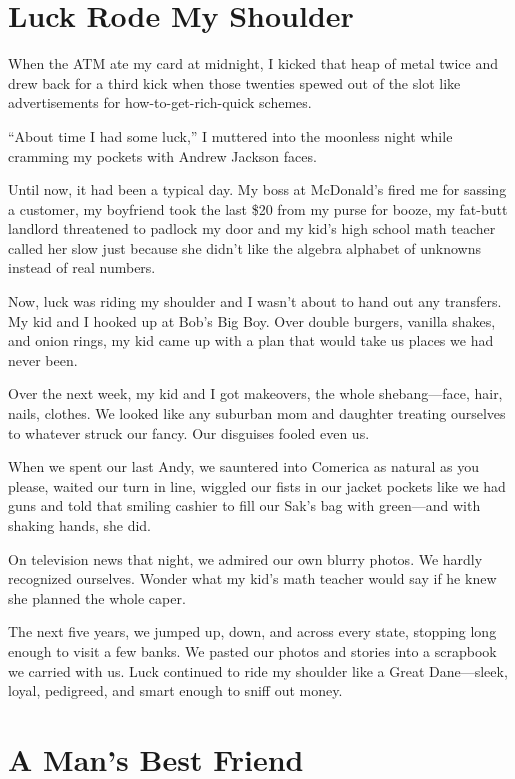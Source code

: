 \documentclass[twoside,10pt]{book}
\begin{document}
\cleardoublepage
\chapter{Luck Rode My Shoulder}

When the ATM ate my card at midnight, I kicked that heap of metal twice
and drew back for a third kick when those twenties spewed out of the
slot like advertisements for how-to-get-rich-quick schemes.

``About time I had some luck,'' I muttered into the moonless night while
cramming my pockets with Andrew Jackson faces.

Until now, it had been a typical day. My boss at McDonald's fired me for
sassing a customer, my boyfriend took the last \$20 from my purse for
booze, my fat-butt landlord threatened to padlock my door and my kid's
high school math teacher called her slow just because she didn't like
the algebra alphabet of unknowns instead of real numbers.

Now, luck was riding my shoulder and I wasn't about to hand out any
transfers. My kid and I hooked up at Bob's Big Boy. Over double burgers,
vanilla shakes, and onion rings, my kid came up with a plan that would
take us places we had never been.

Over the next week, my kid and I got makeovers, the whole
shebang---face, hair, nails, clothes. We looked like any suburban mom
and daughter treating ourselves to whatever struck our fancy. Our
disguises fooled even us.

When we spent our last Andy, we sauntered into Comerica as natural as
you please, waited our turn in line, wiggled our fists in our jacket
pockets like we had guns and told that smiling cashier to fill our Sak's
bag with green---and with shaking hands, she did.

On television news that night, we admired our own blurry photos. We
hardly recognized our­selves. Wonder what my kid's math teacher would
say if he knew she planned the whole caper.

The next five years, we jumped up, down, and across every state,
stopping long enough to visit a few banks. We pasted our photos and
stories into a scrapbook we carried with us. Luck continued to ride my
shoulder like a Great Dane---sleek, loyal, pedigreed, and smart enough
to sniff out money.



\cleardoublepage
\chapter{A Man's Best Friend}
\end{document}
